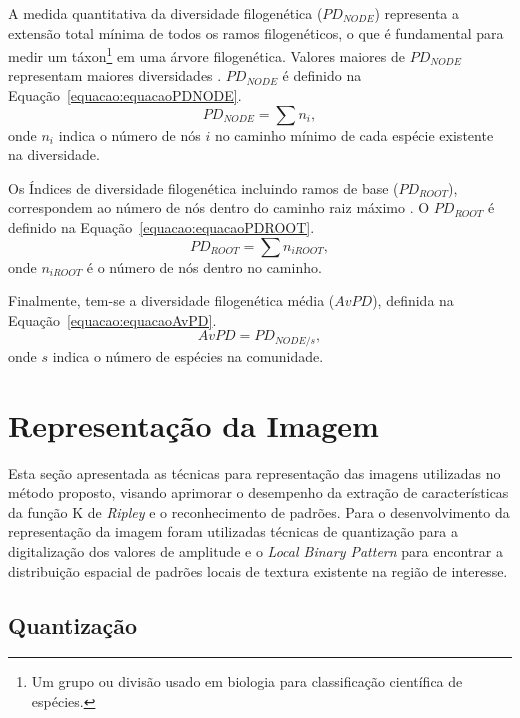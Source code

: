 A medida quantitativa da diversidade filogenética ($PD_{NODE}$) representa a extensão total mínima de todos os ramos filogenéticos, o que é fundamental para medir um táxon\footnote{Um grupo ou divisão usado em biologia para classificação científica de espécies.} em uma árvore filogenética. Valores maiores de $ PD_{NODE}$ representam maiores diversidades \cite{faith1992conservation}. $PD_{NODE}$ é definido na Equação~\ref{equacao:equacaoPDNODE}.
\begin{equation}
\label{equacao:equacaoPDNODE}
 PD_{NODE} = \sum n_{i},
\end{equation}
onde $n_{i}$ indica o número de nós $i$ no caminho mínimo de cada espécie existente na diversidade.

Os Índices de diversidade filogenética incluindo ramos de base ($PD_{ROOT}$), correspondem ao número de nós dentro do caminho raiz máximo \cite{rodrigues2002maximising}. O $PD_{ROOT}$ é definido na Equação~\ref{equacao:equacaoPDROOT}.
\begin{equation}
\label{equacao:equacaoPDROOT}
PD_{ROOT} = \sum n_{iROOT},
\end{equation}
onde $n_{iROOT}$ é o número de nós dentro no caminho.

Finalmente, tem-se a diversidade filogenética média ($AvPD$), definida na Equação~\ref{equacao:equacaoAvPD}.
\begin{equation}
\label{equacao:equacaoAvPD}
AvPD = PD_{NODE/s},
\end{equation}
onde $s$ indica o número de espécies na comunidade.

\section{Representação da Imagem}
\label{sec:representacao da imagem}

Esta seção apresentada as técnicas para representação das imagens utilizadas no método proposto, visando aprimorar o desempenho da extração de características da função K de \textit{Ripley} e o reconhecimento de padrões. Para o desenvolvimento da representação da imagem foram utilizadas técnicas de quantização para a digitalização dos valores de amplitude e o \textit{Local Binary Pattern} para encontrar a distribuição espacial de padrões locais de textura existente na região de interesse. 

\subsection{Quantização}
\label{sec:quantizacao}

